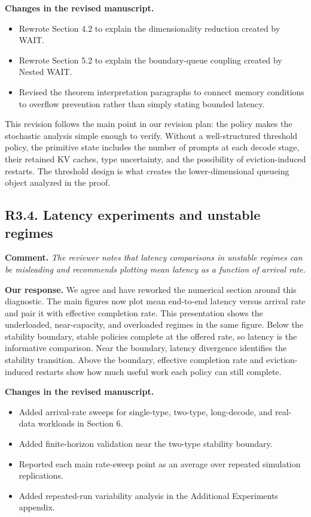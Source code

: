 \documentclass[11pt]{article}
\newcommand{\comment}[1]{%
  \vspace{0.25em}
  \noindent\textbf{Comment.} \emph{#1}
}
\newcommand{\response}{\vspace{0.25em}\noindent\textbf{Our response.} }
\newcommand{\changes}{\vspace{0.25em}\noindent\textbf{Changes in the revised manuscript.} }
\begin{document}
\changes
\begin{itemize}
    \item Rewrote Section 4.2 to explain the dimensionality reduction created by WAIT.
    \item Rewrote Section 5.2 to explain the boundary-queue coupling created by Nested WAIT.
    \item Revised the theorem interpretation paragraphs to connect memory conditions to overflow prevention rather than simply stating bounded latency.
\end{itemize}

\vspace{0.25em}
\noindent This revision follows the main point in our revision plan: the policy makes the stochastic analysis simple enough to verify. Without a well-structured threshold policy, the primitive state includes the number of prompts at each decode stage, their retained KV caches, type uncertainty, and the possibility of eviction-induced restarts. The threshold design is what creates the lower-dimensional queueing object analyzed in the proof.

\subsection*{R3.4. Latency experiments and unstable regimes}

\comment{The reviewer notes that latency comparisons in unstable regimes can be misleading and recommends plotting mean latency as a function of arrival rate.}

\response We agree and have reworked the numerical section around this diagnostic. The main figures now plot mean end-to-end latency versus arrival rate and pair it with effective completion rate. This presentation shows the underloaded, near-capacity, and overloaded regimes in the same figure. Below the stability boundary, stable policies complete at the offered rate, so latency is the informative comparison. Near the boundary, latency divergence identifies the stability transition. Above the boundary, effective completion rate and eviction-induced restarts show how much useful work each policy can still complete.

\changes
\begin{itemize}
    \item Added arrival-rate sweeps for single-type, two-type, long-decode, and real-data workloads in Section 6.
    \item Added finite-horizon validation near the two-type stability boundary.
    \item Reported each main rate-sweep point as an average over repeated simulation replications.
    \item Added repeated-run variability analysis in the Additional Experiments appendix.
\end{itemize}
\end{document}

